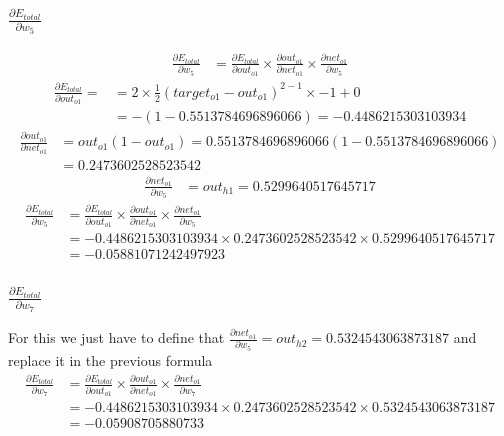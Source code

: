 \documentclass{article}
\begin{document}
\subsubsection{$\frac{\partial E_{total}}{\partial w_5}$}

\begin{align*}
    \frac{\partial E_{total}}{\partial w_5} & =
    \frac{\partial E_{total}}{\partial out_{o1}} \times
    \frac{\partial out_{o1}}{\partial net_{o1}} \times
    \frac{\partial net_{o1}}{\partial w_5} 
\end{align*}
\begin{align*}
    \frac{\partial E_{total}}{\partial out_{o1}} =
    & = 2 \times \frac{1}{2}(target_{o1} - out_{o1})^{2 - 1} \times -1 + 0 \\
    & = -(1- 0.5513784696896066)= -0.4486215303103934
\end{align*}
\begin{align*}
    \frac{\partial out_{o1}}{\partial net_{o1}} & =
    out_{o1}(1 - out_{o1}) = 0.5513784696896066(1- 0.5513784696896066) \\
    & =0.2473602528523542
\end{align*}
\begin{align*}
    \frac{\partial net_{o1}}{\partial w_5} & = 
    out_{h1} = 0.5299640517645717
\end{align*}
\begin{align*}
    \frac{\partial E_{total}}{\partial w_5} & =
    \frac{\partial E_{total}}{\partial out_{o1}} \times
    \frac{\partial out_{o1}}{\partial net_{o1}} \times
    \frac{\partial net_{o1}}{\partial w_5} \\
    & = -0.4486215303103934 \times 0.2473602528523542 \times 0.5299640517645717 \\
    & = -0.05881071242497923
\end{align*}

\subsubsection{$\frac{\partial E_{total}}{\partial w_7}$}
For this we just have to define that $
    \frac{\partial net_{o1}}{\partial w_5} = out_{h2} = 0.5324543063873187
$ and replace it in the previous formula
\begin{align*}
    \frac{\partial E_{total}}{\partial w_7} & =
    \frac{\partial E_{total}}{\partial out_{o1}} \times
    \frac{\partial out_{o1}}{\partial net_{o1}} \times
    \frac{\partial net_{o1}}{\partial w_7} \\
    & = -0.4486215303103934 \times 0.2473602528523542 \times 0.5324543063873187
    \\
    & =-0.05908705880733
\end{align*}
\end{document}
